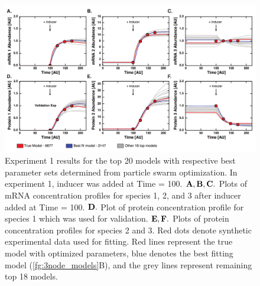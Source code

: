 \documentclass[12pt]{article}
\begin{document}
\begin{figure}\centering
\includegraphics[width=1.0\textwidth]{./figs_chp3/Fig2_Top20_Models_2.pdf}
\caption{Experiment 1 results for the top 20 models with respective best parameter sets determined from particle swarm optimization. In experiment 1, inducer was added at Time = 100. $\bf{A, B, C.}$ Plots of mRNA concentration profiles for species 1, 2, and 3 after inducer added at Time = 100. $\bf{D.}$ Plot of protein concentration profile for species 1 which was used for validation. $\bf{E, F.}$ Plots of protein concentration profiles for species 2 and 3. Red dots denote synthetic experimental data used for fitting. Red lines represent the true model with optimized parameters, blue denotes the best fitting model (\ref{fg:3node_models}B), and the grey lines represent remaining top 18 models.}
\label{fg:Top20Models}
\end{figure}

\clearpage
\end{document}
